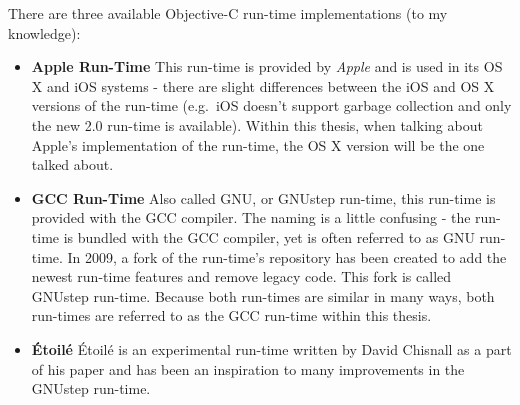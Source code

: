 There are three available Objective-C run-time implementations (to my knowledge):

\begin{itemize}
  \item{\bf{Apple Run-Time}} This run-time is provided by \emph{Apple} and is used in its OS X and iOS systems - there are slight differences between the iOS and OS X versions of the run-time (e.g.\ iOS doesn't support garbage collection and only the new 2.0 run-time is available). Within this thesis, when talking about Apple's implementation of the run-time, the OS X version will be the one talked about.
  \item{\bf{GCC Run-Time}} Also called GNU, or GNUstep run-time, this run-time is provided with the GCC compiler. The naming is a little confusing - the run-time is bundled with the GCC compiler, yet is often referred to as GNU run-time. In 2009, a fork of the run-time's repository has been created to add the newest run-time features and remove legacy code. This fork is called GNUstep run-time. Because both run-times are similar in many ways, both run-times are referred to as the GCC run-time within this thesis.
  \item{\bf{\'{E}toil\'{e}}} \'{E}toil\'{e} is an experimental run-time written by David Chisnall as a part of his paper and has been an inspiration to many improvements in the GNUstep run-time\cite{etoile_article}.
\end{itemize}

